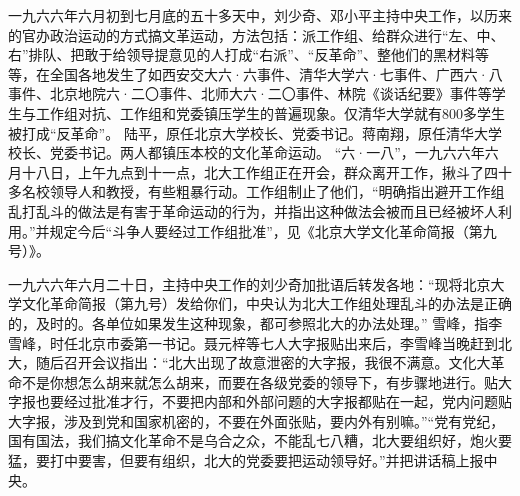 \begin{maonote}
一九六六年六月初到七月底的五十多天中，刘少奇、邓小平主持中央工作，以历来的官办政治运动的方式搞文革运动，方法包括：派工作组、给群众进行“左、中、右”排队、把敢于给领导提意见的人打成“右派”、“反革命”、整他们的黑材料等等，在全国各地发生了如西安交大六·六事件、清华大学六·七事件、广西六·八事件、北京地院六·二〇事件、北师大六·二〇事件、林院《谈话纪要》事件等学生与工作组对抗、工作组和党委镇压学生的普遍现象。仅清华大学就有800多学生被打成“反革命”。
陆平，原任北京大学校长、党委书记。蒋南翔，原任清华大学校长、党委书记。两人都镇压本校的文化革命运动。
“六·一八”，一九六六年六月十八日，上午九点到十一点，北大工作组正在开会，群众离开工作，揪斗了四十多名校领导人和教授，有些粗暴行动。工作组制止了他们，“明确指出避开工作组乱打乱斗的做法是有害于革命运动的行为，并指出这种做法会被而且已经被坏人利用。”并规定今后“斗争人要经过工作组批准”，见《北京大学文化革命简报（第九号）》。

一九六六年六月二十日，主持中央工作的刘少奇加批语后转发各地：“现将北京大学文化革命简报（第九号）发给你们，中央认为北大工作组处理乱斗的办法是正确的，及时的。各单位如果发生这种现象，都可参照北大的办法处理。”
雪峰，指李雪峰，时任北京市委第一书记。聂元梓等七人大字报贴出来后，李雪峰当晚赶到北大，随后召开会议指出：“北大出现了故意泄密的大字报，我很不满意。文化大革命不是你想怎么胡来就怎么胡来，而要在各级党委的领导下，有步骤地进行。贴大字报也要经过批准才行，不要把内部和外部问题的大字报都贴在一起，党内问题贴大字报，涉及到党和国家机密的，不要在外面张贴，要内外有别嘛。”“党有党纪，国有国法，我们搞文化革命不是乌合之众，不能乱七八糟，北大要组织好，炮火要猛，要打中要害，但要有组织，北大的党委要把运动领导好。”并把讲话稿上报中央。
\end{maonote}
